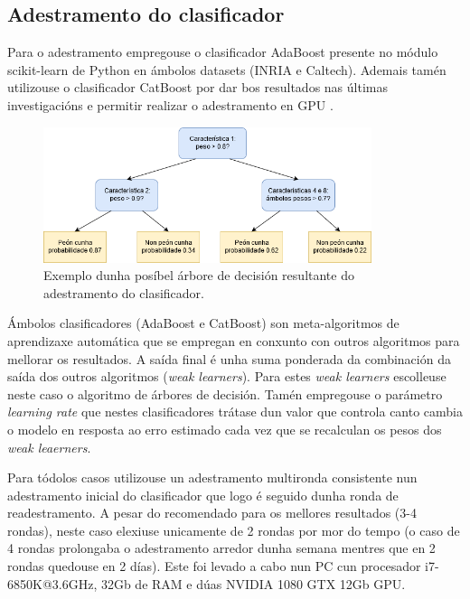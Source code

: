 \documentclass[galician]{./head/uvigo-tfg}
\begin{document}
        
        \subsection{Adestramento do clasificador}\label{training} Para o adestramento empregouse o clasificador AdaBoost presente no módulo scikit-learn\cite{scikit-learn} de Python en ámbolos datasets (INRIA e Caltech). Ademais tamén utilizouse o clasificador CatBoost\cite{CatBoost} por dar bos resultados nas últimas investigacións e  permitir realizar o adestramento en GPU \cite{CatBoost}.
       \begin{figure}[t]
            \centering
            \includegraphics[height=150px]{figures/DecisionTreeExample.png}
            \caption{Exemplo dunha posíbel árbore de decisión resultante do adestramento do clasificador.}
            \label{fig:decisionTree}
        \end{figure}
        \par Ámbolos clasificadores (AdaBoost e CatBoost) son meta-algoritmos de aprendizaxe automática que se empregan en conxunto con outros algoritmos para mellorar os resultados. A saída final é unha suma ponderada da combinación da saída dos outros algoritmos (\textit{weak learners}). Para estes \textit{weak learners} escolleuse neste caso o algoritmo de árbores de decisión. Tamén empregouse o parámetro \textit{learning rate} que nestes clasificadores trátase dun valor que controla canto cambia o modelo en resposta ao erro estimado cada vez que se recalculan os pesos dos \textit{weak leaerners}.
        \par Para tódolos casos utilizouse un adestramento multironda consistente nun adestramento inicial do clasificador que logo é seguido dunha ronda de readestramento. A pesar do recomendado para os mellores resultados (3-4 rondas)\cite{zhang}\cite{filtered}, neste caso elexiuse unicamente de 2 rondas por mor do tempo (o caso de 4 rondas prolongaba o adestramento arredor dunha semana mentres que en 2 rondas quedouse en 2 días). Este foi levado a cabo nun PC cun procesador i7-6850K@3.6GHz, 32Gb de RAM e dúas NVIDIA 1080 GTX 12Gb GPU.
\end{document}

